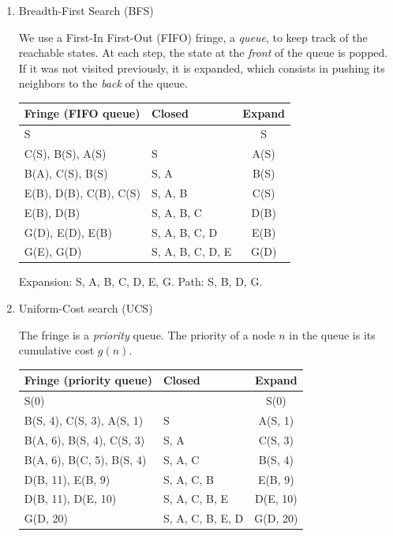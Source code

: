 \documentclass[11pt, a4paper]{article}
\begin{document}
\begin{enumerate}
    \item Breadth-First Search (BFS)

    \begin{solution}
        We use a First-In First-Out (FIFO) fringe, \ie{} a \emph{queue}, to keep track of the reachable states. At each step, the state at the \emph{front} of the queue is popped. If it was not visited previously, it is expanded, which consists in pushing its neighbors to the \emph{back} of the queue.

        \begin{table}[h]
            \centering
            \begin{tabular}{l|l|c}
                \toprule
                Fringe (FIFO queue) & Closed & Expand \\
                \midrule
                S & & S \\
                C(S), B(S), A(S) & S & A(S) \\
                B(A), C(S), B(S) & S, A & B(S) \\
                E(B), D(B), C(B), C(S) & S, A, B & C(S) \\
                E(B), D(B) & S, A, B, C & D(B) \\
                G(D), E(D), E(B) & S, A, B, C, D & E(B) \\
                G(E), G(D) & S, A, B, C, D, E & G(D) \\
                \bottomrule
            \end{tabular}
        \end{table}

        Expansion: S, A, B, C, D, E, G. Path: S, B, D, G.
    \end{solution}

    \item Uniform-Cost search (UCS)

    \begin{solution}
        The fringe is a \emph{priority} queue. The priority of a node $n$ in the queue is its cumulative cost $g(n)$.

        \begin{table}[h]
            \centering
            \begin{tabular}{l|l|c}
                \toprule
                Fringe (priority queue) & Closed & Expand \\
                \midrule
                S(0) & & S(0) \\
                B(S, 4), C(S, 3), A(S, 1) & S & A(S, 1) \\
                B(A, 6), B(S, 4), C(S, 3) & S, A & C(S, 3) \\
                B(A, 6), B(C, 5), B(S, 4) & S, A, C & B(S, 4) \\
                D(B, 11), E(B, 9) & S, A, C, B & E(B, 9) \\
                D(B, 11), D(E, 10) & S, A, C, B, E & D(E, 10) \\
                G(D, 20) & S, A, C, B, E, D & G(D, 20) \\
                \bottomrule
            \end{tabular}
        \end{table}


\end{solution}
\end{enumerate}
\end{document}
